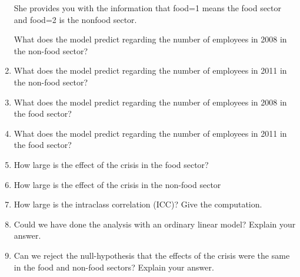 \documentclass[]{report}\usepackage[]{graphicx}\usepackage[]{color}
\begin{document}
\begin{enumerate}
She provides you with the information that food=1 means the food sector and food=2 is the nonfood sector.

What does the model predict regarding the number of employees in 2008 in the non-food sector?
\item What does the model predict regarding the number of employees in 2011 in the non-food sector?
\item What does the model predict regarding the number of employees in 2008 in the food sector?
\item What does the model predict regarding the number of employees in 2011 in the food sector?
\item How large is the effect of the crisis in the food sector?
\item How large is the effect of the crisis in the non-food sector
\item How large is the intraclass correlation (ICC)? Give the computation.
\item Could we have done the analysis with an ordinary linear model? Explain your answer.
\item Can we reject the null-hypothesis that the effects of the crisis were the same in the food and non-food sectors? Explain your answer.
\end{enumerate}
\end{document}
